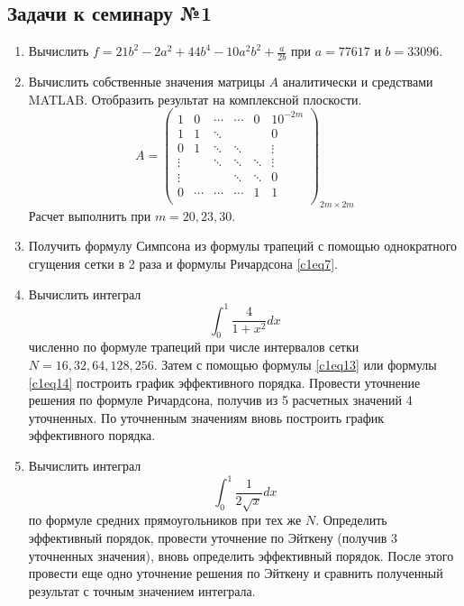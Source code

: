 \subsection{Задачи к семинару №1}
\begin{enumerate}
\item Вычислить $\displaystyle f = 21b^2 - 2a^2 + 44b^4 - 10a^2b^2 + \frac{a}{2b}$ при $a = 77617$ и $b = 33096$.
\item Вычислить собственные значения матрицы $A$ аналитически и средствами MATLAB. Отобразить результат на комплексной плоскости.
\begin{equation} \nonumber
A = 
\begin{pmatrix}
1 & 0 & \cdots & \cdots & 0 & 10^{-2m} \\
1 & 1 & \ddots &  &  & 0 \\
0 & 1 & \ddots &  \ddots &  & \vdots \\
\vdots &  & \ddots & \ddots & \ddots & \vdots \\
\vdots &  &  & \ddots & \ddots  & 0 \\
0 & \cdots & \cdots &  \cdots & 1 & 1 \\
\end{pmatrix}_{2m \times 2m}
\end{equation}
Расчет выполнить при $m = 20,23,30$.
\item Получить формулу Симпсона из формулы трапеций с помощью однократного сгущения сетки в 2 раза и формулы Ричардсона \eqref{c1eq7}.
\item Вычислить интеграл 
\begin{equation} \nonumber
\int_{0}^{1} \frac{4}{1 + x^2} dx
\end{equation}
численно по формуле трапеций при числе интервалов сетки $N = 16,32,64,128,256$. Затем с помощью формулы \eqref{c1eq13} или формулы \eqref{c1eq14} построить график эффективного порядка. Провести уточнение решения по формуле Ричардсона, получив из 5 расчетных значений 4 уточненных. По уточненным значениям вновь построить график эффективного порядка.
\item Вычислить интеграл 
\begin{equation} \nonumber
\int_{0}^{1} \frac{1}{2 \sqrt{x}} dx
\end{equation}
по формуле средних прямоугольников при тех же $N$. Определить эффективный порядок, провести уточнение по Эйткену (получив 3 уточненных значения), вновь определить эффективный порядок. После этого провести еще одно уточнение решения по Эйткену и сравнить полученный результат с точным значением интеграла.
\end {enumerate}